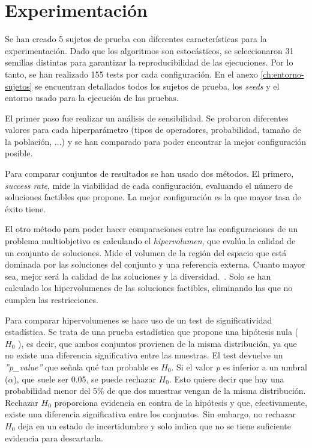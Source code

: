 \chapter{Experimentación}
\label{ch:experimentacion}

Se han creado 5 sujetos de prueba con diferentes características para la experimentación. Dado que los algoritmos son estocásticos, se seleccionaron 31 semillas distintas para garantizar la reproducibilidad de las ejecuciones. Por lo tanto, se han realizado 155 tests por cada configuración. En el anexo \ref{ch:entorno-sujetos} se encuentran detallados todos los sujetos de prueba, los \textit{seeds} y el entorno usado para la ejecución de las pruebas.

El primer paso fue realizar un análisis de sensibilidad. Se probaron diferentes valores para cada hiperparámetro (tipos de operadores, probabilidad, tamaño de la población, ...) y se han comparado para poder encontrar la mejor configuración posible.

Para comparar conjuntos de resultados se han usado dos métodos. El primero, \textit{success rate}, mide la viabilidad de cada configuración, evaluando el número de soluciones factibles que propone. La mejor configuración es la que mayor tasa de éxito tiene.

El otro método para poder hacer comparaciones entre las configuraciones de un problema multiobjetivo es calculando el \textit{hipervolumen}, que evalúa la calidad de un conjunto de soluciones. Mide el volumen de la región del espacio que está dominada por las soluciones del conjunto y una referencia externa. Cuanto mayor sea, mejor será la calidad de las soluciones y la diversidad.~\cite{pymoo2024hypervolume}. Solo se han calculado los hipervolumenes de las soluciones factibles, eliminando las que no cumplen las restricciones.

Para comparar hipervolumenes se hace uso de un test de significatividad estadística. Se trata de una prueba estadística que propone una hipótesis nula (\(H_0\) ), es decir, que ambos conjuntos provienen de la misma distribución, ya que no existe una diferencia significativa entre las muestras. El test devuelve un \textit{''p\_value''} que señala qué tan probable es \(H_0\). Si el valor \textit{p} es inferior a un umbral ($\alpha$), que suele ser 0.05, se puede rechazar \(H_0\). Esto quiere decir que hay una probabilidad menor del 5\% de que dos muestras vengan de la misma distribución.
\newpage
Rechazar \(H_0\) proporciona evidencia en contra de la hipótesis y que, efectivamente, existe una diferencia significativa entre los conjuntos. Sin embargo, no rechazar \(H_0\) deja en un estado de incertidumbre y solo indica que no se tiene suficiente evidencia para descartarla.

